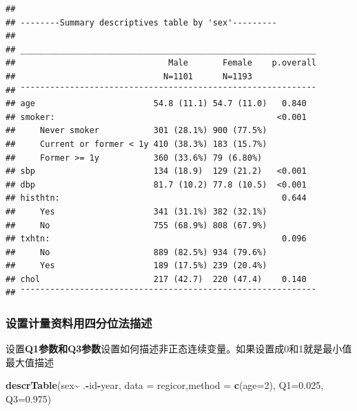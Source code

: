 \documentclass[
]{article}
\newenvironment{Shaded}{\begin{snugshade}}{\end{snugshade}}
\newcommand{\AttributeTok}[1]{\textcolor[rgb]{0.13,0.29,0.53}{#1}}
\newcommand{\DecValTok}[1]{\textcolor[rgb]{0.00,0.00,0.81}{#1}}
\newcommand{\FloatTok}[1]{\textcolor[rgb]{0.00,0.00,0.81}{#1}}
\newcommand{\FunctionTok}[1]{\textcolor[rgb]{0.13,0.29,0.53}{\textbf{#1}}}
\newcommand{\NormalTok}[1]{#1}
\newcommand{\SpecialCharTok}[1]{\textcolor[rgb]{0.81,0.36,0.00}{\textbf{#1}}}
\newcommand{\StringTok}[1]{\textcolor[rgb]{0.31,0.60,0.02}{#1}}
\begin{document}
\begin{verbatim}
## 
## --------Summary descriptives table by 'sex'---------
## 
## ____________________________________________________________ 
##                               Male       Female    p.overall 
##                              N=1101      N=1193              
## ¯¯¯¯¯¯¯¯¯¯¯¯¯¯¯¯¯¯¯¯¯¯¯¯¯¯¯¯¯¯¯¯¯¯¯¯¯¯¯¯¯¯¯¯¯¯¯¯¯¯¯¯¯¯¯¯¯¯¯¯ 
## age                        54.8 (11.1) 54.7 (11.0)   0.840   
## smoker:                                             <0.001   
##     Never smoker           301 (28.1%) 900 (77.5%)           
##     Current or former < 1y 410 (38.3%) 183 (15.7%)           
##     Former >= 1y           360 (33.6%) 79 (6.80%)            
## sbp                        134 (18.9)  129 (21.2)   <0.001   
## dbp                        81.7 (10.2) 77.8 (10.5)  <0.001   
## histhtn:                                             0.644   
##     Yes                    341 (31.1%) 382 (32.1%)           
##     No                     755 (68.9%) 808 (67.9%)           
## txhtn:                                               0.096   
##     No                     889 (82.5%) 934 (79.6%)           
##     Yes                    189 (17.5%) 239 (20.4%)           
## chol                       217 (42.7)  220 (47.4)    0.140   
## ¯¯¯¯¯¯¯¯¯¯¯¯¯¯¯¯¯¯¯¯¯¯¯¯¯¯¯¯¯¯¯¯¯¯¯¯¯¯¯¯¯¯¯¯¯¯¯¯¯¯¯¯¯¯¯¯¯¯¯¯
\end{verbatim}

\subsubsection{\texorpdfstring{\textbf{设置计量资料用四分位法描述}}{设置计量资料用四分位法描述}}\label{ux8bbeux7f6eux8ba1ux91cfux8d44ux6599ux7528ux56dbux5206ux4f4dux6cd5ux63cfux8ff0}

设置\textbf{Q1参数和Q3参数}设置如何描述非正态连续变量。如果设置成0和1就是最小值最大值描述

\begin{Shaded}
\begin{Highlighting}[]
\FunctionTok{descrTable}\NormalTok{(}\StringTok{\textasciigrave{}}\AttributeTok{sex}\StringTok{\textasciigrave{}}\SpecialCharTok{\textasciitilde{}}\NormalTok{ .}\SpecialCharTok{{-}}\NormalTok{id}\SpecialCharTok{{-}}\NormalTok{year, }\AttributeTok{data =}\NormalTok{ regicor,}\AttributeTok{method =} \FunctionTok{c}\NormalTok{(}\AttributeTok{age=}\DecValTok{2}\NormalTok{),}
           \AttributeTok{Q1=}\FloatTok{0.025}\NormalTok{, }\AttributeTok{Q3=}\FloatTok{0.975}\NormalTok{)}
\end{Highlighting}
\end{Shaded}
\end{document}

